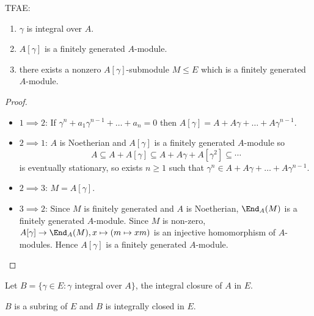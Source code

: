 \documentclass[a4paper]{article}
\begin{document}
\begin{lemma}
  TFAE:
  \begin{enumerate}
  \item \(\gamma\) is integral over \(A\).
  \item \(A[\gamma]\) is a finitely generated \(A\)-module.
  \item there exists a nonzero \(A[\gamma]\)-submodule \(M \leq E\) which is a finitely generated \(A\)-module.
  \end{enumerate}
\end{lemma}

\begin{proof}\leavevmode
  \begin{itemize}
  \item \(1 \implies 2\): If \(\gamma^n + a_1 \gamma^{n - 1} + \dots + a_n = 0\) then \(A[\gamma] = A + A \gamma + \dots + A\gamma^{n - 1}\).
  \item \(2 \implies 1\): \(A\) is Noetherian and \(A[\gamma]\) is a finitely generated \(A\)-module so
    \[
      A \subseteq A + A[\gamma] \subseteq A + A\gamma + A[\gamma^2] \subseteq \cdots
    \]
    is eventually stationary, so exists \(n \geq 1\) such that \(\gamma^n \in A + A\gamma + \dots + A\gamma^{n - 1}\).
  \item \(2 \implies 3\): \(M = A[\gamma]\).
  \item \(3 \implies 2\): Since \(M\) is finitely generated and \(A\) is Noetherian, \(\End_A(M)\) is a finitely generated \(A\)-module. Since \(M\) is non-zero, \(A[\gamma] \to \End_A(M), x \mapsto (m \mapsto xm)\) is an injective homomorphism of \(A\)-modules. Hence \(A[\gamma]\) is a finitely generated \(A\)-module.
  \end{itemize}
\end{proof}

Let \(B = \{\gamma \in E: \gamma \text{ integral over } A\}\), the integral closure of \(A\) in \(E\).

\begin{lemma}
  \(B\) is a subring of \(E\) and \(B\) is integrally closed in \(E\).
\end{lemma}
\end{document}
